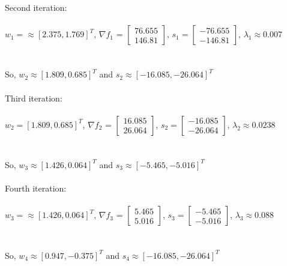 \documentclass{article}
\begin{document}
\noindent Second iteration:\\\\ $w_1 = \approx [2.375, 1.769]^T$, \( \nabla f_1 \) = $ \begin{bmatrix} 
  76.655 \\
  146.81 
\end{bmatrix}$, $ s_1 = \begin{bmatrix} 
  -76.655 \\
  -146.81
\end{bmatrix}$, $\lambda_1 \approx 0.007$\\ \\ \\ So, $w_2 \approx [1.809, 0.685]^T$ and $s_2 \approx [-16.085, -26.064]^T$ \\ \\

\noindent Third iteration:\\\\ $w_2 = [1.809, 0.685]^T$, \( \nabla f_2 \) = $ \begin{bmatrix} 
  16.085\\
  26.064 
\end{bmatrix}$, $ s_2 = \begin{bmatrix} 
  -16.085\\
  -26.064
\end{bmatrix}$, $\lambda_2 \approx 0.0238$\\ \\ \\ So, $w_3 \approx [1.426, 0.064]^T$ and $s_3 \approx [-5.465, -5.016]^T$ \\ \\

\noindent Fourth iteration:\\\\ $w_3 = \approx [1.426, 0.064]^T$, \( \nabla f_3 \) = $ \begin{bmatrix} 
  5.465\\
  5.016 
\end{bmatrix}$, $ s_3 = \begin{bmatrix} 
  -5.465\\
  -5.016
\end{bmatrix}$, $\lambda_3 \approx 0.088$\\ \\ \\ So, $w_4 \approx [0.947, -0.375]^T$ and $s_4 \approx [-16.085, -26.064]^T$ \\ \\
\end{document}
